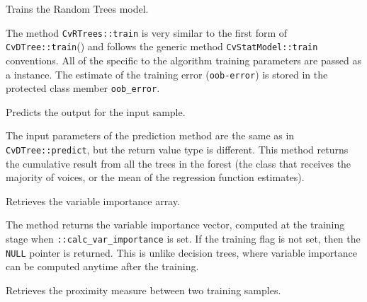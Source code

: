 Trains the Random Trees model.


The method \texttt{CvRTrees::train} is very similar to the first form of \texttt{CvDTree::train}() and follows the generic method \texttt{CvStatModel::train} conventions. All of the specific to the algorithm training parameters are passed as a  instance. The estimate of the training error (\texttt{oob-error}) is stored in the protected class member \texttt{oob\_error}.


Predicts the output for the input sample.


The input parameters of the prediction method are the same as in \texttt{CvDTree::predict}, but the return value type is different. This method returns the cumulative result from all the trees in the forest (the class that receives the majority of voices, or the mean of the regression function estimates).


Retrieves the variable importance array.


The method returns the variable importance vector, computed at the training stage when \texttt{::calc\_var\_importance} is set. If the training flag is not set, then the \texttt{NULL} pointer is returned. This is unlike decision trees, where variable importance can be computed anytime after the training.


Retrieves the proximity measure between two training samples.

